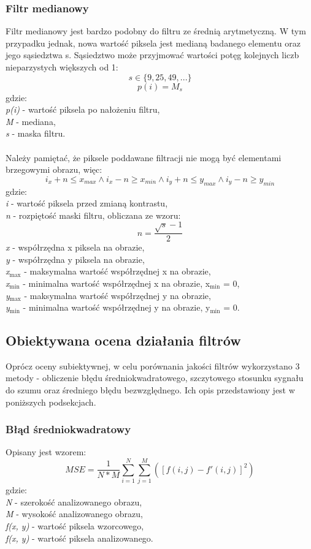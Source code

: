 \documentclass{classrep}
\begin{document}
\subsubsection{Filtr medianowy}
Filtr medianowy jest bardzo podobny do filtru ze średnią arytmetyczną. W tym przypadku jednak, nowa wartość piksela jest medianą badanego elementu oraz jego sąsiedztwa s. Sąsiedztwo może przyjmować wartości potęg kolejnych liczb nieparzystych większych od 1:\\
\[ s \in \{9,25,49,...\} \]
\[ p(i) = M_{s} \]
gdzie:\\
\textit{p(i)} - wartość piksela po nałożeniu filtru,\\
\textit{M} - mediana,\\
\textit{s} - maska filtru.\\
\\
Należy pamiętać, że piksele poddawane filtracji nie mogą być elementami brzegowymi obrazu, więc:
\[ i_x + n \leq x_{max} \wedge i_x - n \geq x_{min} \wedge i_y + n \leq y_{max} \wedge i_y - n \geq y_{min} \]
gdzie:\\
\textit{i} - wartość piksela przed zmianą kontrastu,\\
\textit{n} - rozpiętość maski filtru, obliczana ze wzoru:\\
\[ n = \frac{\sqrt{s}-1}{2} \]
\textit{x} - współrzędna x piksela na obrazie,\\
\textit{y} - współrzędna y piksela na obrazie,\\
\textit{x$_{\text{max}}$} - maksymalna wartość współrzędnej x na obrazie,\\
\textit{x$_{\text{min}}$} - minimalna wartość współrzędnej x na obrazie, x$_{\text{min}}$ = 0,\\
\textit{y$_{\text{max}}$} - maksymalna wartość współrzędnej y na obrazie,\\
\textit{y$_{\text{min}}$} - minimalna wartość współrzędnej y na obrazie, y$_{\text{min}}$ = 0.\\

\subsection{Obiektywana ocena działania filtrów}
Oprócz oceny subiektywnej, w celu porównania jakości filtrów wykorzystano 3 metody - obliczenie błędu średniokwadratowego, szczytowego stosunku sygnału do szumu oraz średniego błędu bezwzględnego. Ich opis przedstawiony jest w poniższych podsekcjach.

\subsubsection{Błąd średniokwadratowy}
Opisany jest wzorem:
\[ MSE = \frac{1}{N \ast M} \sum_{i=1}^{N} \sum_{j=1}^{M} ([f(i, j) - f'(i, j)]^2)\]
gdzie:\\
\textit{N} - szerokość analizowanego obrazu,\\
\textit{M} - wysokość analizowanego obrazu,\\
\textit{f(x, y)} - wartość piksela wzorcowego,\\
\textit{f(x, y)} - wartość piksela analizowanego.\\
\end{document}
